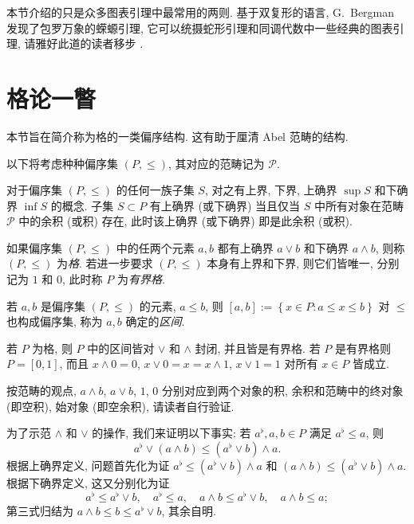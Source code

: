 本节介绍的只是众多图表引理中最常用的两则. 基于双复形的语言, G.\ Bergman 发现了包罗万象的蝾螈引理, 它可以统摄蛇形引理和同调代数中一些经典的图表引理, 请雅好此道的读者移步 \cite{Be12}.

\section{格论一瞥}\label{sec:lattices}
本节旨在简介称为格的一类偏序结构. 这有助于厘清 Abel 范畴的结构.

以下将考虑种种偏序集 $(P, \leq)$, 其对应的范畴记为 $\mathcal{P}$.

对于偏序集 $(P, \leq)$ 的任何一族子集 $S$, 对之有上界, 下界, 上确界 $\sup S$ 和下确界 $\inf S$ 的概念. 子集 $S \subset P$ 有上确界 (或下确界) 当且仅当 $S$ 中所有对象在范畴 $\mathcal{P}$ 中的余积 (或积) 存在, 此时该上确界 (或下确界) 即是此余积 (或积).

\begin{definition}\label{def:lattice-order}
	如果偏序集 $(P, \leq)$ 中的任两个元素 $a,b$ 都有上确界 $a \vee b$ 和下确界 $a \wedge b$, 则称 $(P, \leq)$ 为\emph{格}. 若进一步要求 $(P, \leq)$ 本身有上界和下界, 则它们皆唯一, 分别记为 $1$ 和 $0$, 此时称 $P$ 为\emph{有界格}.
	
	若 $a, b$ 是偏序集 $(P, \leq)$ 的元素, $a \leq b$, 则 $[a, b] := \left\{x \in P: a \leq x \leq b \right\}$ 对 $\leq$ 也构成偏序集, 称为 $a, b$ 确定的\emph{区间}.
\end{definition}

若 $P$ 为格, 则 $P$ 中的区间皆对 $\vee$ 和 $\wedge$ 封闭, 并且皆是有界格. 若 $P$ 是有界格则 $P = [0, 1]$, 而且 $x \wedge 0 = 0$, $x \vee 0 = x = x \wedge 1$, $x \vee 1 = 1$ 对所有 $x \in P$ 皆成立.

按范畴的观点, $a \wedge b$, $a \vee b$, $1$, $0$ 分别对应到两个对象的积, 余积和范畴中的终对象 (即空积), 始对象 (即空余积), 请读者自行验证.

为了示范 $\wedge$ 和 $\vee$ 的操作, 我们来证明以下事实: 若 $a^\flat, a, b \in P$ 满足 $a^\flat \leq a$, 则
\begin{equation}\label{eqn:modular-inequality}
	a^\flat \vee (a \wedge b) \leq (a^\flat \vee b) \wedge a.
\end{equation}
根据上确界定义, 问题首先化为证 $a^\flat \leq (a^\flat \vee b) \wedge a$ 和 $(a \wedge b) \leq (a^\flat \vee b) \wedge a$. 根据下确界定义, 这又分别化为证
\[ a^\flat \leq a^\flat \vee b, \quad a^\flat \leq a, \quad a \wedge b \leq a^\flat \vee b, \quad a \wedge b \leq a; \]
第三式归结为 $a \wedge b \leq b \leq a^\flat \vee b$, 其余自明.


